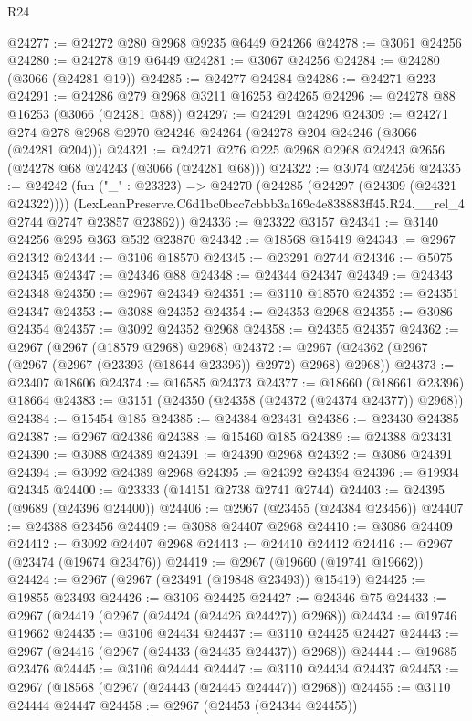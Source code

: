 \begin{lexlean}{R24}
\begin{coremodule}
@24277 := @24272 @280 @2968 @9235 @6449 @24266
@24278 := @3061 @24256
@24280 := @24278 @19 @6449
@24281 := @3067 @24256
@24284 := @24280 (@3066 (@24281 @19))
@24285 := @24277 @24284
@24286 := @24271 @223
@24291 := @24286 @279 @2968 @3211 @16253 @24265
@24296 := @24278 @88 @16253 (@3066 (@24281 @88))
@24297 := @24291 @24296
@24309 := @24271 @274 @278 @2968 @2970 @24246 @24264 (@24278 @204 @24246 (@3066 (@24281 @204)))
@24321 := @24271 @276 @225 @2968 @2968 @24243 @2656 (@24278 @68 @24243 (@3066 (@24281 @68)))
@24322 := @3074 @24256
@24335 := @24242
    (fun ("_" : @23323) =>
    @24270
      (@24285 (@24297 (@24309 (@24321 @24322))))
      (LexLeanPreserve.C6d1bc0bcc7cbbb3a169c4e838883ff45.R24.__rel_4 @2744 @2747 @23857 @23862))
@24336 := @23322 @3157
@24341 := @3140 @24256 @295 @363 @532 @23870
@24342 := @18568 @15419
@24343 := @2967 @24342
@24344 := @3106 @18570
@24345 := @23291 @2744
@24346 := @5075 @24345
@24347 := @24346 @88
@24348 := @24344 @24347
@24349 := @24343 @24348
@24350 := @2967 @24349
@24351 := @3110 @18570
@24352 := @24351 @24347
@24353 := @3088 @24352
@24354 := @24353 @2968
@24355 := @3086 @24354
@24357 := @3092 @24352 @2968
@24358 := @24355 @24357
@24362 := @2967 (@2967 (@18579 @2968) @2968)
@24372 := @2967 (@24362 (@2967 (@2967 (@2967 (@23393 (@18644 @23396)) @2972) @2968) @2968))
@24373 := @23407 @18606
@24374 := @16585 @24373
@24377 := @18660 (@18661 @23396) @18664
@24383 := @3151 (@24350 (@24358 (@24372 (@24374 @24377)) @2968))
@24384 := @15454 @185
@24385 := @24384 @23431
@24386 := @23430 @24385
@24387 := @2967 @24386
@24388 := @15460 @185
@24389 := @24388 @23431
@24390 := @3088 @24389
@24391 := @24390 @2968
@24392 := @3086 @24391
@24394 := @3092 @24389 @2968
@24395 := @24392 @24394
@24396 := @19934 @24345
@24400 := @23333 (@14151 @2738 @2741 @2744)
@24403 := @24395 (@9689 (@24396 @24400))
@24406 := @2967 (@23455 (@24384 @23456))
@24407 := @24388 @23456
@24409 := @3088 @24407 @2968
@24410 := @3086 @24409
@24412 := @3092 @24407 @2968
@24413 := @24410 @24412
@24416 := @2967 (@23474 (@19674 @23476))
@24419 := @2967 (@19660 (@19741 @19662))
@24424 := @2967 (@2967 (@23491 (@19848 @23493)) @15419)
@24425 := @19855 @23493
@24426 := @3106 @24425
@24427 := @24346 @75
@24433 := @2967 (@24419 (@2967 (@24424 (@24426 @24427)) @2968))
@24434 := @19746 @19662
@24435 := @3106 @24434
@24437 := @3110 @24425 @24427
@24443 := @2967 (@24416 (@2967 (@24433 (@24435 @24437)) @2968))
@24444 := @19685 @23476
@24445 := @3106 @24444
@24447 := @3110 @24434 @24437
@24453 := @2967 (@18568 (@2967 (@24443 (@24445 @24447)) @2968))
@24455 := @3110 @24444 @24447
@24458 := @2967 (@24453 (@24344 @24455))

\end{coremodule}
\end{lexlean}
